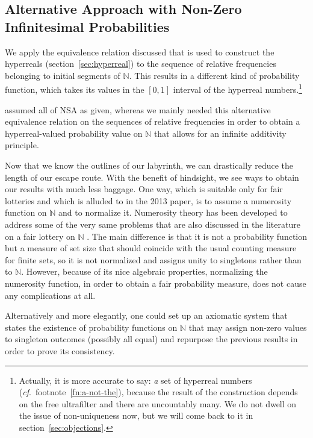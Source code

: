 \subsection{Alternative Approach with Non-Zero Infinitesimal Probabilities}\label{sec:alternative}
We apply the equivalence relation discussed that is used to construct the hyperreals (section~\ref{sec:hyperreal}) to the sequence of relative frequencies belonging to initial segments of $\mathbb{N}$. This results in a different kind of probability function, which takes its values in the $[0,1]$ interval of the hyperreal numbers.\footnote{Actually, it is more accurate to say: \emph{a} set of hyperreal numbers (\textit{cf}.\ footnote~\ref{fn:a-not-the}), because the result of the construction depends on the free ultrafilter and there are uncountably many. We do not dwell on the issue of non-uniqueness now, but we will come back to it in section~\ref{sec:objections}.}

\citet{WenmackersHorsten:2013} assumed all of NSA as given, whereas we mainly needed this alternative equivalence relation on the sequences of relative frequencies in order to obtain a hyperreal-valued probability value on $\mathbb{N}$ that allows for an infinite additivity principle.

Now that we know the outlines of our labyrinth, we can drastically reduce the length of our escape route.
With the benefit of hindsight, we see ways to obtain our results with much less baggage. One way, which is suitable only for fair lotteries and which is alluded to in the 2013 paper, is to assume a numerosity function on $\mathbb{N}$ and to normalize it. Numerosity theory has been developed to address some of the very same problems that are also discussed in the literature on a fair lottery on $\mathbb{N}$ \citep{BenciDiNasso:2003b,Mancosu:2009}. The main difference is that it is not a probability function but a measure of set size that should coincide with the usual counting measure for finite sets, so it is not normalized and assigns unity to singletons rather than to $\mathbb{N}$. However, because of its nice algebraic properties, normalizing the numerosity function, in order to obtain a fair probability measure, does not cause any complications at all.

Alternatively and more elegantly, one could set up an axiomatic system that states the existence of probability functions on $\mathbb{N}$ that may assign non-zero values to singleton outcomes (possibly all equal) and repurpose the previous results in order to prove its consistency.

